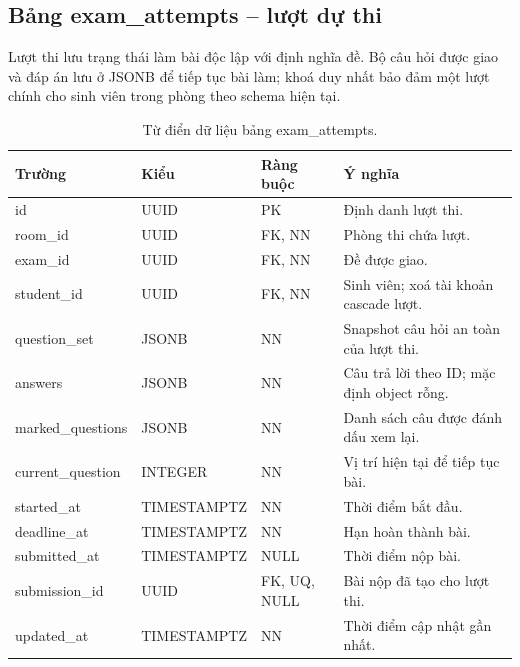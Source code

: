 \subsection{Bảng exam\_attempts -- lượt dự thi}
Lượt thi lưu trạng thái làm bài độc lập với định nghĩa đề. Bộ câu hỏi được
giao và đáp án lưu ở JSONB để tiếp tục bài làm; khoá duy nhất
 bảo đảm một lượt chính cho sinh viên trong
phòng theo schema hiện tại.
\begin{table}[H]
\centering
\caption{Từ điển dữ liệu bảng exam\_attempts.}
\label{tab:dict-attempts}
\begin{tabularx}{\textwidth}{>{\ttfamily\color{daumaroon}}p{}p{}p{}X}
\toprule
\rowcolor{gray100}Trường & Kiểu & Ràng buộc & Ý nghĩa \\
\midrule
id & UUID & PK & Định danh lượt thi. \\
room\_id & UUID & FK, NN & Phòng thi chứa lượt. \\
exam\_id & UUID & FK, NN & Đề được giao. \\
student\_id & UUID & FK, NN & Sinh viên; xoá tài khoản cascade lượt. \\
question\_set & JSONB & NN & Snapshot câu hỏi an toàn của lượt thi. \\
answers & JSONB & NN & Câu trả lời theo ID; mặc định object rỗng. \\
marked\_questions & JSONB & NN & Danh sách câu được đánh dấu xem lại. \\
current\_question & INTEGER & NN & Vị trí hiện tại để tiếp tục bài. \\
started\_at & TIMESTAMPTZ & NN & Thời điểm bắt đầu. \\
deadline\_at & TIMESTAMPTZ & NN & Hạn hoàn thành bài. \\
submitted\_at & TIMESTAMPTZ & NULL & Thời điểm nộp bài. \\
submission\_id & UUID & FK, UQ, NULL & Bài nộp đã tạo cho lượt thi. \\
updated\_at & TIMESTAMPTZ & NN & Thời điểm cập nhật gần nhất. \\
\bottomrule
\end{tabularx}
\end{table}

